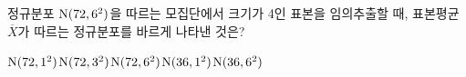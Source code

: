 정규분포 $\mathrm{N}(72{,}\mkern3mu\mathopen{}6^2)$을 따르는 모집단에서 크기가 4인 표본을 임의추출할 때, 표본평균 $\overline{X}$가 따르는 정규분포를 바르게 나타낸 것은?
\begin{choices32}{$\mathrm{N}(72{,}\mkern3mu\mathopen{}1^2)$}{$\mathrm{N}(72{,}\mkern3mu\mathopen{}3^2)$}{$\mathrm{N}(72{,}\mkern3mu\mathopen{}6^2)$}{$\mathrm{N}(36{,}\mkern3mu\mathopen{}1^2)$}{$\mathrm{N}(36{,}\mkern3mu\mathopen{}6^2)$}\end{choices32}
